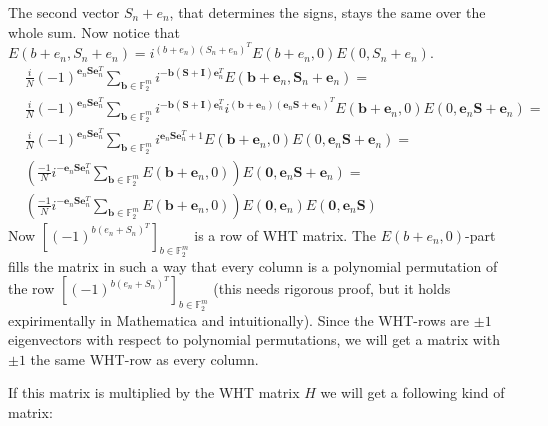 \documentclass{article}
\begin{document}
	The second vector $S_n+e_n$, that determines the signs, stays the same over the whole sum. Now notice that $E(b+e_n, S_n + e_n) = i^{(b+e_n)(S_n+e_n)^T}E(b + e_n, 0)E(0,S_n + e_n)$.
	\begin{align*}
		&\frac{i}{N}(-1)^{\mathbf{e}_n\mathbf{S}\mathbf{e}_n^T} \sum_{\mathbf{b}\in \mathbb{F}_2^m} i^{-\mathbf{b}(\mathbf{S}+\mathbf{I})\mathbf{e}_n^T }E(\mathbf{b}+\mathbf{e}_n,\mathbf{S}_n+\mathbf{e}_n) = \\ &\frac{i}{N}(-1)^{\mathbf{e}_n\mathbf{S}\mathbf{e}_n^T} \sum_{\mathbf{b}\in \mathbb{F}_2^m} i^{-\mathbf{b}(\mathbf{S}+\mathbf{I})\mathbf{e}_n^T } i^{(\mathbf{b}+\mathbf{e}_n)(\mathbf{e}_n\mathbf{S}+\mathbf{e}_n)^T}E(\mathbf{b} + \mathbf{e}_n, 0)E(0,\mathbf{e}_n \mathbf{S} + \mathbf{e}_n)= \\
		&\frac{i}{N}(-1)^{\mathbf{e}_n\mathbf{S}\mathbf{e}_n^T} \sum_{\mathbf{b}\in \mathbb{F}_2^m}  i^{\mathbf{e}_n \mathbf{S}\mathbf{e}_n^T + 1}E(\mathbf{b} + \mathbf{e}_n, 0)E(0,\mathbf{e}_n \mathbf{S} + \mathbf{e}_n)= \\
		&\left(\frac{-1}{N}i^{-\mathbf{e}_n\mathbf{S}\mathbf{e}_n^T} \sum_{\mathbf{b}\in \mathbb{F}_2^m}  E(\mathbf{b} + \mathbf{e}_n, 0)\right)E(\mathbf{0},\mathbf{e}_n \mathbf{S} + \mathbf{e}_n) = \\
		& \left(\frac{-1}{N}i^{-\mathbf{e}_n\mathbf{S}\mathbf{e}_n^T} \sum_{\mathbf{b}\in \mathbb{F}_2^m}  E(\mathbf{b} + \mathbf{e}_n, 0)\right)E(\mathbf{0},\mathbf{e}_n) E(\mathbf{0},\mathbf{e}_n\mathbf{S})
	\end{align*}
	Now 
	$\left[(-1)^{b(e_n+S_n)^T}\right]_{b \in \mathbb{F}_2^m}$ is a row of WHT matrix. 
	The $E(b+e_n,0)$-part fills the matrix in such a way that every column is a polynomial permutation of the row $\left[(-1)^{b(e_n+S_n)^T}\right]_{b \in \mathbb{F}_2^m}$ (this needs rigorous proof, but it holds expirimentally in Mathematica and intuitionally). Since the WHT-rows are $\pm 1$ eigenvectors with respect to polynomial permutations, we will get a matrix with $\pm 1$ the same WHT-row as every column. \newpage 
	
	If this matrix is multiplied by the WHT matrix $H$ we will get a following kind of matrix:
	
\end{document}
